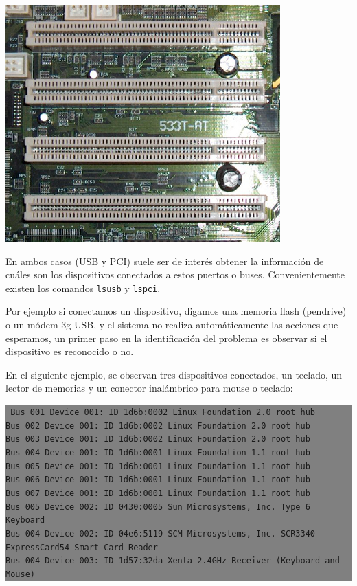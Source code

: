 \documentclass[12pt]{article}
\begin{document}
\begin{center}
 \includegraphics{Bus_pci.jpg}
\end{center}

En ambos casos (USB y PCI) suele ser de interés obtener la información de cuáles son 
los dispositivos conectados a estos puertos o buses. Convenientemente existen los 
comandos \texttt{lsusb} y \texttt{lspci}. 

Por ejemplo si conectamos un dispositivo, digamos una memoria flash (pendrive) o un 
módem 3g USB, y el sistema no realiza automáticamente las acciones que esperamos, un primer paso en la 
identificación del problema es observar si el dispositivo es reconocido o no. 

En el siguiente ejemplo, se observan tres dispositivos conectados, un teclado, 
un lector de memorias y un conector inalámbrico para mouse o teclado: 
 
\colorbox{grey}{\parbox[t]{0.95\linewidth}{ \vspace*{0.5cm} { 
{\tt
Bus 001 Device 001: ID 1d6b:0002 Linux Foundation 2.0 root hub\\
Bus 002 Device 001: ID 1d6b:0002 Linux Foundation 2.0 root hub\\
Bus 003 Device 001: ID 1d6b:0002 Linux Foundation 2.0 root hub\\
Bus 004 Device 001: ID 1d6b:0001 Linux Foundation 1.1 root hub\\
Bus 005 Device 001: ID 1d6b:0001 Linux Foundation 1.1 root hub\\
Bus 006 Device 001: ID 1d6b:0001 Linux Foundation 1.1 root hub\\
Bus 007 Device 001: ID 1d6b:0001 Linux Foundation 1.1 root hub\\
Bus 005 Device 002: ID 0430:0005 Sun Microsystems, Inc. Type 6 Keyboard\\
Bus 004 Device 002: ID 04e6:5119 SCM Microsystems, Inc. SCR3340 - ExpressCard54 Smart Card Reader\\
Bus 004 Device 003: ID 1d57:32da Xenta 2.4GHz Receiver (Keyboard and Mouse)
}
} \vspace*{0.5cm} } } 
\end{document}

